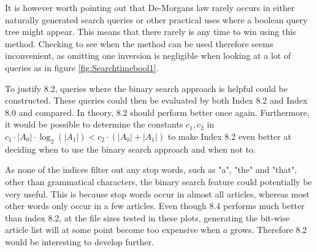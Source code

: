 It is however worth pointing out that De-Morgans law rarely occurs in either naturally generated search queries or other practical uses where a boolean query tree might appear. This means that there rarely is any time to win using this method. Checking to see when the method can be used therefore seems inconvenient, as omitting one inversion is negligible when looking at a lot of queries as in figure \ref{fig:Searchtimebool1}.

To justify 8.2, queries where the binary search approach is helpful could be constructed. These queries could then be evaluated by both Index 8.2 and Index 8.0 and compared. In theory, 8.2 should perform better once again. Furthermore, it would be possible to determine the constants $c_1, c_2$ in $c_1\cdot|A_0| \cdot \log_2(|A_1|) < c_2\cdot (|A_0| +  |A_1|)$ to make Index 8.2 even better at deciding when to use the binary search approach and when not to.

As none of the indices filter out any stop words, such as "a", "the" and "that", other than grammatical characters, the binary search feature could potentially be very useful. This is because stop words occur in almost all articles, whereas most other words only occur in a few articles. Even though 8.4 performs much better than index 8.2, at the file sizes tested in these plots, generating the bit-wise article list will at some point become too expensive when $a$ grows. Therefore 8.2 would be interesting to develop further.
